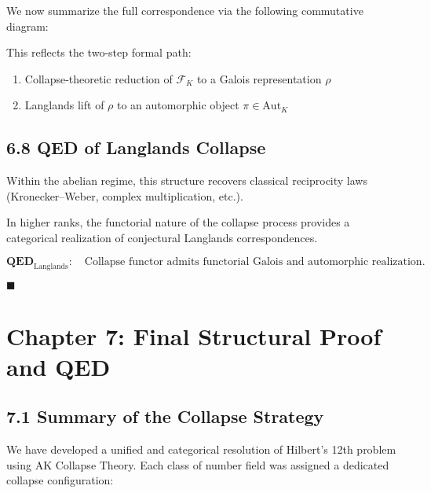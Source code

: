 \documentclass[11pt]{article}
\begin{document}
We now summarize the full correspondence via the following commutative diagram:

\begin{center}
\end{center}

This reflects the two-step formal path:
\begin{enumerate}
    \item Collapse-theoretic reduction of \( \mathcal{F}_K \) to a Galois representation \( \rho \)
    \item Langlands lift of \( \rho \) to an automorphic object \( \pi \in \mathrm{Aut}_K \)
\end{enumerate}

\subsection{6.8 QED of Langlands Collapse}

Within the abelian regime, this structure recovers classical reciprocity laws (Kronecker–Weber, complex multiplication, etc.).

In higher ranks, the functorial nature of the collapse process provides a categorical realization of conjectural Langlands correspondences.

\[
\textbf{QED}_{\mathrm{Langlands}}: \quad \text{Collapse functor admits functorial Galois and automorphic realization.}
\]

\hfill $\blacksquare$




\section{Chapter 7: Final Structural Proof and QED}

\subsection{7.1 Summary of the Collapse Strategy}

We have developed a unified and categorical resolution of Hilbert's 12th problem using AK Collapse Theory.  
Each class of number field was assigned a dedicated collapse configuration:
\end{document}
